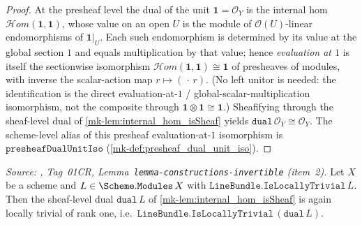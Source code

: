 \begin{proof}
  \leanok
  At the presheaf level the dual of the unit \(\mathbf{1} = \mathcal{O}_Y\) is the internal
  hom \(\mathcal{H}om(\mathbf{1}, \mathbf{1})\), whose value on an open \(U\) is the module
  of \(\mathcal{O}(U)\)-linear endomorphisms of \(\mathbf{1}|_U\). Each such endomorphism is
  determined by its value at the global section \(1\) and equals multiplication by that
  value; hence \emph{evaluation at \(1\)} is itself the sectionwise isomorphism
  \(\mathcal{H}om(\mathbf{1}, \mathbf{1}) \cong \mathbf{1}\) of presheaves of modules, with
  inverse the scalar-action map \(r \mapsto (\,\cdot\,r)\). (No left unitor is needed: the
  identification is the direct evaluation-at-\(1\) / global-scalar-multiplication
  isomorphism, not the composite through \(\mathbf{1} \otimes \mathbf{1} \cong \mathbf{1}\).)
  Sheafifying through the sheaf-level dual of \ref{mk-lem:internal_hom_isSheaf} yields
  \(\mathtt{dual}\,\mathcal{O}_Y \cong \mathcal{O}_Y\). The scheme-level alias of this
  presheaf evaluation-at-\(1\) isomorphism is
  \(\mathtt{presheafDualUnitIso}\) (\ref{mk-def:presheaf_dual_unit_iso}).
\end{proof}

\begin{lemma}\label{mk-lem:dual_isLocallyTrivial}
  \leanok

  \textit{Source: \cite{stacks-project}, Tag~01CR,
  Lemma~\texttt{lemma-constructions-invertible} (item~2).}
  Let \(X\) be a scheme and \(L \in \Scheme.\mathtt{Modules}\,X\) with
  \(\mathtt{LineBundle.IsLocallyTrivial}\,L\). Then the sheaf-level dual
  \(\mathtt{dual}\,L\) of \ref{mk-lem:internal_hom_isSheaf} is again locally trivial of
  rank one, i.e.\ \(\mathtt{LineBundle.IsLocallyTrivial}\,(\mathtt{dual}\,L)\).
\end{lemma}

